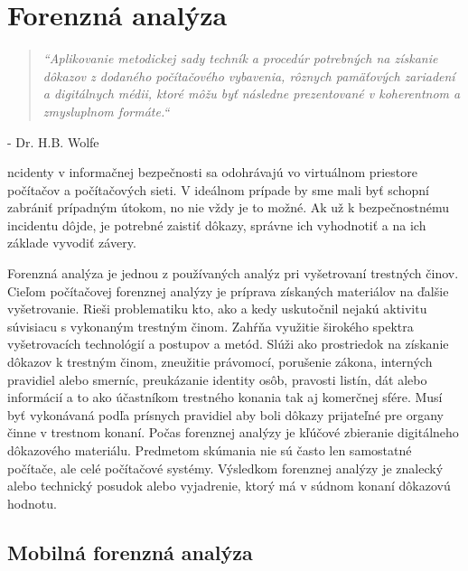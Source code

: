 \newcommand{\qe}[3]{\begin{quotation} \textit{``#1``} \end{quotation} \begin{flushright} - #2\end{flushright} }

\chapter{Forenzná analýza}


\qe{Aplikovanie metodickej sady techník a procedúr potrebných na získanie dôkazov z dodaného počítačového vybavenia, rôznych pamäťových zariadení a digitálnych médii, ktoré môžu byť následne prezentované v koherentnom a zmysluplnom formáte.}{Dr. H.B. Wolfe}

Incidenty v informačnej bezpečnosti sa odohrávajú vo virtuálnom priestore počítačov a počítačových sieti. V ideálnom prípade by sme mali byť schopní zabrániť prípadným útokom, no nie vždy je to možné. Ak už k bezpečnostnému incidentu dôjde, je potrebné zaistiť dôkazy, správne ich vyhodnotiť a na ich základe vyvodiť závery.

Forenzná analýza je jednou z používaných analýz pri vyšetrovaní trestných činov. Cieľom počítačovej forenznej analýzy je príprava získaných materiálov na ďalšie vyšetrovanie. Rieši problematiku kto, ako a kedy uskutočnil nejakú aktivitu súvisiacu s vykonaným trestným činom. Zahŕňa využitie širokého spektra vyšetrovacích technológií a postupov a metód. Slúži ako prostriedok na získanie dôkazov k trestným činom, zneužitie právomocí, porušenie zákona, interných pravidiel alebo smerníc, preukázanie identity osôb, pravosti listín, dát alebo informácií a to ako účastníkom trestného konania tak aj komerčnej sfére. Musí byť vykonávaná podľa prísnych pravidiel aby boli dôkazy prijateľné pre organy činne v trestnom konaní. Počas forenznej analýzy je kľúčové zbieranie digitálneho dôkazového materiálu. Predmetom skúmania nie sú často len samostatné počítače, ale celé počítačové systémy. Výsledkom forenznej analýzy je znalecký alebo technický posudok alebo vyjadrenie, ktorý má v súdnom konaní dôkazovú hodnotu.

\section{Mobilná forenzná analýza}


